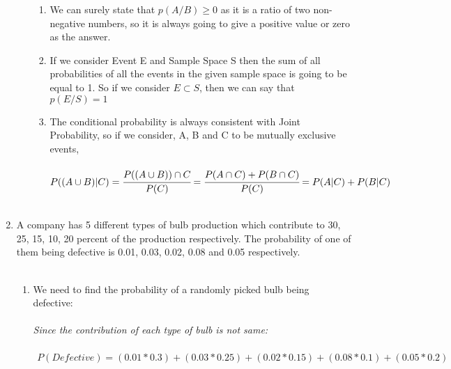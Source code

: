 \documentclass{article}
\begin{document}
\begin{enumerate}
\begin{enumerate}
         \begin{enumerate}
            
            \item  We can surely state that $p(A/B) \geq 0$ as it is a ratio of two non-negative numbers, so it is always going to give a positive value or zero as the answer. \\
            \item If we consider Event E and Sample Space S then the sum of all probabilities of all the events in the given sample space is going to be equal to 1.  
            So if we consider $E \subset S$, then we can say that $p(E/S) = 1$ \\ 
            \item The conditional probability is always consistent with Joint Probability, so if we consider, A, B and C to be mutually exclusive events, \\ \\ 
            $P( ( A \cup B ) | C ) \\\\ 
            = \cfrac{P( (A \cup B) ) \cap C}{P(C)}  \\\\  
            = \cfrac{P(A \cap C) + P(B \cap C)}{P(C)} \\ \\ 
            = P(A|C) + P(B|C) $ \\\\ 
        \end{enumerate}

\end{enumerate}


\newpage

\item \large A company has 5 different types of bulb production which contribute to 30, 25, 15, 10, 20 percent of the production respectively. The probability of one of them being defective is 0.01, 0.03, 0.02, 0.08 and 0.05 respectively.\\\\
\begin{enumerate}
\item We need to find the probability of a randomly picked bulb being defective:\\\\
\textit{Since the contribution of each type of bulb is not same:}\\\\
$\begin{aligned}
    P(Defective) = (0.01*0.3) + (0.03*0.25) + (0.02*0.15) + (0.08*0.1) + (0.05*0.2)
\end{aligned}$\\


\end{enumerate}
\end{enumerate}
\end{document}
